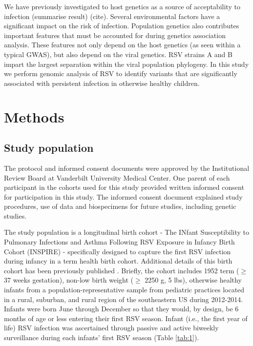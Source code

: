 \documentclass{article}
\begin{document}
We have previously investigated to host genetics as a source of acceptability to infection (summarise result) (cite).
Several environmental factors have a significant impact on the risk of infection. 
Population genetics also contributes important features that must be accounted for during genetics association analysis. 
These features not only depend on the host genetics (as seen within a typical GWAS), but also depend on the viral genetics.
RSV strains A and B impart the largest separation within the viral population phylogeny.
In this study we perform genomic analysis of RSV to identify variants that are significantly associated with persistent infection in otherwise healthy children.

\section{Methods}
\subsection{Study population}
The protocol and informed consent documents were approved by the Institutional Review Board at Vanderbilt University Medical Center. 
One parent of each participant in the cohorts used for this study provided written informed consent for participation in this study. 
The informed consent document explained study procedures, use of data and biospecimens for future studies, including genetic studies.

The study population is a longitudinal birth cohort - The INfant Susceptibility to Pulmonary Infections and Asthma Following RSV Exposure in Infancy Birth Cohort (INSPIRE) - specifically designed to capture the first RSV infection during infancy in a term health birth cohort. 
Additional details of this birth cohort has been previously published 
\cite{larkin_objectives_2015}.
Briefly, the cohort includes 1952 term ($\ge$ 37 weeks gestation), non-low birth weight ($\ge$ 2250 g, 5 lbs), otherwise healthy infants from a population-representative sample from pediatric practices located in a rural, suburban, and rural region of the southeastern US during 2012-2014. 
Infants were born June through December so that they would, by design, be 6 months of age or less entering their first RSV season. 
Infant (i.e., the first year of life) RSV infection was ascertained through passive and active biweekly surveillance during each infants' first RSV season
(Table \ref{tab:1}).
\end{document}
